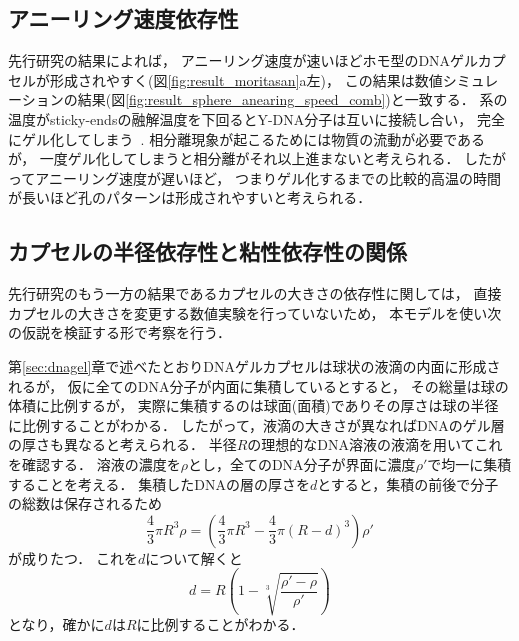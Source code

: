 \subsection{アニーリング速度依存性}
先行研究の結果によれば，
アニーリング速度が速いほどホモ型のDNAゲルカプセルが形成されやすく(図\ref{fig:result_moritasan}a左)，
この結果は数値シミュレーションの結果(図\ref{fig:result_sphere_anearing_speed_comb})と一致する．
系の温度がsticky-endsの融解温度を下回るとY-DNA分子は互いに接続し合い，
完全にゲル化してしまう~\cite{sato2019sequence}.
相分離現象が起こるためには物質の流動が必要であるが，
一度ゲル化してしまうと相分離がそれ以上進まないと考えられる．
したがってアニーリング速度が遅いほど，
つまりゲル化するまでの比較的高温の時間が長いほど孔のパターンは形成されやすいと考えられる．

\subsection{カプセルの半径依存性と粘性依存性の関係}
先行研究のもう一方の結果であるカプセルの大きさの依存性に関しては，
直接カプセルの大きさを変更する数値実験を行っていないため，
本モデルを使い次の仮説を検証する形で考察を行う．

第\ref{sec:dnagel}章で述べたとおりDNAゲルカプセルは球状の液滴の内面に形成されるが，
仮に全てのDNA分子が内面に集積しているとすると，
その総量は球の体積に比例するが，
実際に集積するのは球面(面積)でありその厚さは球の半径に比例することがわかる．
したがって，液滴の大きさが異なればDNAのゲル層の厚さも異なると考えられる．
半径$R$の理想的なDNA溶液の液滴を用いてこれを確認する．
溶液の濃度を$\rho$とし，全てのDNA分子が界面に濃度$\rho'$で均一に集積することを考える．
集積したDNAの層の厚さを$d$とすると，集積の前後で分子の総数は保存されるため
\begin{equation}
    \frac{4}{3}\pi R^3 \rho = \left(\frac{4}{3}\pi R^3-\frac{4}{3}\pi(R-d)^3\right)\rho'
\end{equation}
が成りたつ．
これを$d$について解くと
\begin{equation}
    d = R\left(1-\sqrt[3]{\frac{\rho'-\rho}{\rho'}}\right)
\end{equation}
となり，確かに$d$は$R$に比例することがわかる．

